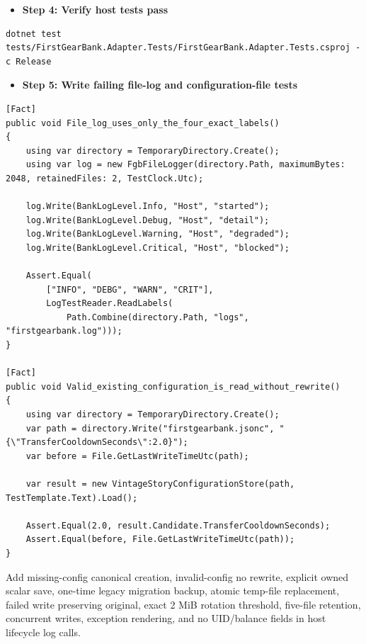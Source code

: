 \documentclass[
  10pt,
  letterpaper,
]{article}
\providecommand{\tightlist}{%
  \setlength{\itemsep}{0pt}\setlength{\parskip}{0pt}}
\begin{document}
\begin{itemize}
\tightlist
\item[$\square$]
  \textbf{Step 4: Verify host tests pass}
\end{itemize}

\begin{lstlisting}
dotnet test tests/FirstGearBank.Adapter.Tests/FirstGearBank.Adapter.Tests.csproj -c Release
\end{lstlisting}

\begin{itemize}
\tightlist
\item[$\square$]
  \textbf{Step 5: Write failing file-log and configuration-file tests}
\end{itemize}

\begin{lstlisting}
[Fact]
public void File_log_uses_only_the_four_exact_labels()
{
    using var directory = TemporaryDirectory.Create();
    using var log = new FgbFileLogger(directory.Path, maximumBytes: 2048, retainedFiles: 2, TestClock.Utc);

    log.Write(BankLogLevel.Info, "Host", "started");
    log.Write(BankLogLevel.Debug, "Host", "detail");
    log.Write(BankLogLevel.Warning, "Host", "degraded");
    log.Write(BankLogLevel.Critical, "Host", "blocked");

    Assert.Equal(
        ["INFO", "DEBG", "WARN", "CRIT"],
        LogTestReader.ReadLabels(
            Path.Combine(directory.Path, "logs", "firstgearbank.log")));
}

[Fact]
public void Valid_existing_configuration_is_read_without_rewrite()
{
    using var directory = TemporaryDirectory.Create();
    var path = directory.Write("firstgearbank.jsonc", "{\"TransferCooldownSeconds\":2.0}");
    var before = File.GetLastWriteTimeUtc(path);

    var result = new VintageStoryConfigurationStore(path, TestTemplate.Text).Load();

    Assert.Equal(2.0, result.Candidate.TransferCooldownSeconds);
    Assert.Equal(before, File.GetLastWriteTimeUtc(path));
}
\end{lstlisting}

Add missing-config canonical creation, invalid-config no rewrite,
explicit owned scalar save, one-time legacy migration backup, atomic
temp-file replacement, failed write preserving original, exact 2 MiB
rotation threshold, five-file retention, concurrent writes, exception
rendering, and no UID/balance fields in host lifecycle log calls.
\end{document}
